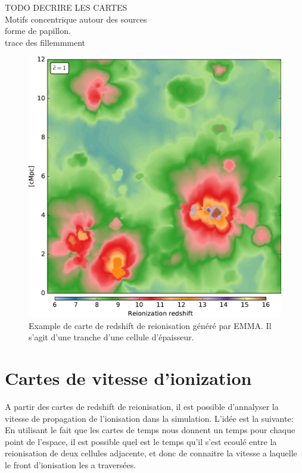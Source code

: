 TODO DECRIRE LES CARTES\\

Motifs concentrique autour des sources\\

forme de papillon.\\

trace des fillemmment\\


\begin{figure}[htpb]
        \includegraphics[width=.95\linewidth]{img/04_mapreio/map_z_c1.pdf} 
        \caption{Example de carte de redshift de reionisation généré par EMMA.
        Il s'agit d'une tranche d'une cellule d'épaisseur.
        }
 		\label{fig:zmap}
\end{figure}

\chapter{Cartes de vitesse d'ionization}

A partir des cartes de redshift de reionisation, il est possible d'annalyser la vitesse de propagation de l'ionisation dans la simulation.
L'idée est la suivante:
En utilisant le fait que les cartes de temps nous donnent un temps pour chaque point de l'espace, il est possible quel est le temps qu'il s'est ecoulé entre la reionisation de deux cellules adjacente, et donc de connaitre la vitesse a laquelle le front d'ionisation les a traversées.

